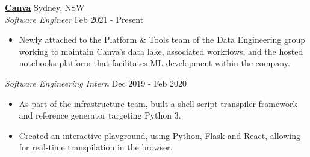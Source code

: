 \documentclass[a4paper]{article}
\newenvironment{myitemize}
{   \small
    \vspace{-2pt}
    \begin{itemize}
    \setlength{\itemsep}{0pt}
    \setlength{\parskip}{0pt}
    \setlength{\parsep}{0pt}     }
{ \end{itemize}                  }
\begin{document}
\textbf{\href{https://www.canva.com/}{Canva}} \hfill Sydney, NSW\\
\textit{Software Engineer} \hfill Feb 2021 - Present\\
\begin{myitemize} \itemsep 0.5mm
	\item Newly attached to the Platform \& Tools team of the Data Engineering group working to maintain Canva's data lake, associated workflows, and the hosted notebooks platform that facilitates ML development within the company.
\end{myitemize}
\vspace{-1mm}
\textit{Software Engineering Intern} \hfill Dec 2019 - Feb 2020\\
\begin{myitemize} \itemsep 0.5mm
	\item As part of the infrastructure team, built a shell script transpiler framework and reference generator targeting Python 3.
	\item Created an interactive playground, using Python, Flask and React, allowing for real-time transpilation in the browser.
\end{myitemize}

\end{document}
